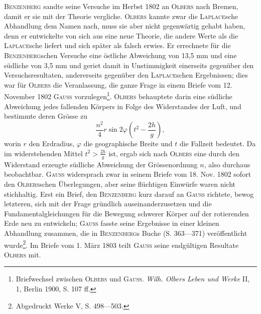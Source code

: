 \textsc{Benzenberg} sandte seine Versuche im Herbst 1802 an \textsc{Olbers} nach Bremen,
damit er sie mit der Theorie vergliche. \textsc{Olbers} kannte zwar die \textsc{Laplace}sche
Abhandlung dem Namen nach, muss sie aber nicht gegenwärtig gehabt
haben, denn er entwickelte von sich aus eine neue Theorie, die andere Werte
\clearpage{}
\noindent als die \textsc{Laplace}sche liefert und sich später als falsch erwies. Er errechnete
für die \textsc{Benzenberg}schen Versuche eine östliche Abweichung von 13,5 mm
und eine südliche von 3,5 mm und geriet damit in Unstimmigkeit einerseits
gegenüber den Versuchsresultaten, andererseits gegenüber den \textsc{Laplace}schen
Ergebnissen; dies war für \textsc{Olbers} die Veranlassung, die ganze Frage in einem
Briefe vom 12. November 1802 \textsc{Gauss} vorzulegen\footnote{Briefwechsel zwischen \textsc{Olbers} und \textsc{Gauss}. \textit{Wilh. Olbers Leben und Werke} II, 1, Berlin 1900,
S. 107 ff.}. \textsc{Olbers} behauptete darin
eine südliche Abweichung jedes fallenden Körpers in Folge des Widerstandes
der Luft, und bestimmte deren Grösse zu
\[
\frac{n^2}{4}r\sin2\varphi\left(t^2-\frac{2h}{g}\right),\tag{6}
\]
\noindent worin $r$ den Erdradius, $\varphi$ die geographische Breite und $t$ die Fallzeit bedeutet.
Da im widerstehenden Mittel $t^2>\frac{2h}{g}$ ist, ergab sich nach \textsc{Olbers}
eine durch den Widerstand erzeugte südliche Abweichung der Grössenordnung
$n$, also durchaus beobachtbar. \textsc{Gauss} widersprach zwar in seinem Briefe vom
18. Nov. 1802 sofort den \textsc{Olbers}schen Überlegungen, aber seine flüchtigen
Einwürfe waren nicht stichhaltig. Erst ein Brief, den \textsc{Benzenberg} kurz darauf
an \textsc{Gauss} richtete, bewog letzteren, sich mit der Frage gründlich auseinanderzusetzen
und die Fundamentalgleichungen für die Bewegung schwerer
Körper auf der rotierenden Erde neu zu entwickeln; \textsc{Gauss} fasste seine Ergebnisse
in einer kleinen Abhandlung zusammen, die in \textsc{Benzenberg}s Buche
(S. 363—371) veröffentlicht wurde\footnote{Abgedruckt Werke V, S. 498—503.}. Im Briefe vom 1. März 1803 teilt \textsc{Gauss}
seine endgültigen Resultate \textsc{Olbers} mit.
\clearpage\endgroup

